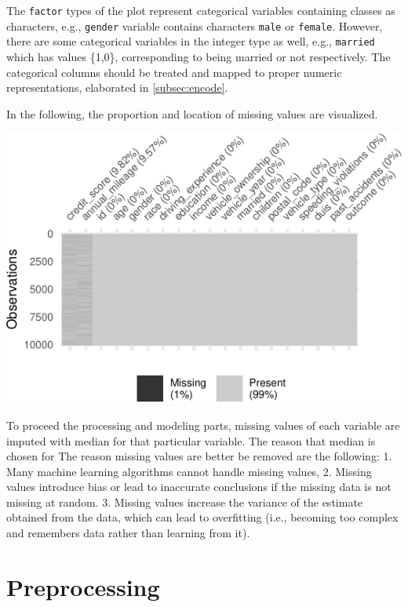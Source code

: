 \documentclass{article}
\begin{document}
The \texttt{factor} types of the plot represent categorical variables
containing classes as characters, e.g., \texttt{gender} variable
contains characters \texttt{male} or \texttt{female}. However, there are
some categorical variables in the integer type as well, e.g.,
\texttt{married} which has values \{1,0\}, corresponding to being
married or not respectively. The categorical columns should be treated
and mapped to proper numeric representations, elaborated in
\ref{subsec:encode}.

In the following, the proportion and location of missing values are
visualized.

\begin{center}\includegraphics{report_files/figure-latex/unnamed-chunk-4-1} \end{center}

To proceed the processing and modeling parts, missing values of each
variable are imputed with median for that particular variable. The
reason that median is chosen for The reason missing values are better be
removed are the following: 1. Many machine learning algorithms cannot
handle missing values, 2. Missing values introduce bias or lead to
inaccurate conclusions if the missing data is not missing at random. 3.
Missing values increase the variance of the estimate obtained from the
data, which can lead to overfitting (i.e., becoming too complex and
remembers data rather than learning from it).

\hypertarget{preprocessing}{%
\section{Preprocessing}\label{preprocessing}}
\end{document}
